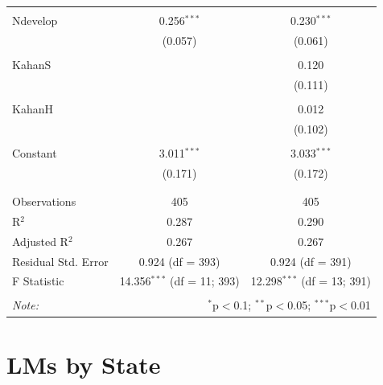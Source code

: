 \documentclass[
]{article}
\begin{document}
\begin{table}[!htbp]
\begin{tabular}{@{\extracolsep{5pt}}lcc}
  & & \\ 
 Ndevelop & 0.256$^{***}$ & 0.230$^{***}$ \\ 
  & (0.057) & (0.061) \\ 
  & & \\ 
 KahanS &  & 0.120 \\ 
  &  & (0.111) \\ 
  & & \\ 
 KahanH &  & 0.012 \\ 
  &  & (0.102) \\ 
  & & \\ 
 Constant & 3.011$^{***}$ & 3.033$^{***}$ \\ 
  & (0.171) & (0.172) \\ 
  & & \\ 
\hline \\[-1.8ex] 
Observations & 405 & 405 \\ 
R$^{2}$ & 0.287 & 0.290 \\ 
Adjusted R$^{2}$ & 0.267 & 0.267 \\ 
Residual Std. Error & 0.924 (df = 393) & 0.924 (df = 391) \\ 
F Statistic & 14.356$^{***}$ (df = 11; 393) & 12.298$^{***}$ (df = 13; 391) \\ 
\hline 
\hline \\[-1.8ex] 
\textit{Note:}  & \multicolumn{2}{r}{$^{*}$p$<$0.1; $^{**}$p$<$0.05; $^{***}$p$<$0.01} \\ 
\end{tabular} 
\end{table} 
\endgroup
\newpage

\hypertarget{lms-by-state}{%
\section{LMs by State}\label{lms-by-state}}
\end{document}
